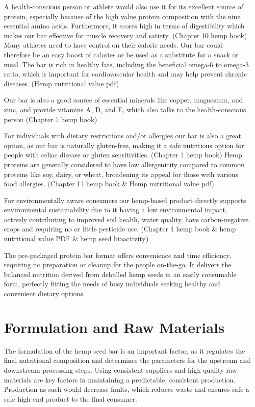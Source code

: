 \vspace{1em}
A health-conscious person or athlete would also use it for its excellent source of protein, especially because of the high value protein composition with the nine essential amino acids. Furthermore, it scores high in terms of digestibility which makes our bar effective for muscle recovery and satiety. (Chapter 10 hemp book) Many athletes need to have control on their calorie needs. Our bar could therefore be an easy boost of calories or be used as a substitute for a snack or meal.
\vspace{0.5em}
The bar is rich in healthy fats, including the beneficial omega-6 to omega-3 ratio, which is important for cardiovascular health and may help prevent chronic diseases. (Hemp nutritional value pdf)

\vspace{1em}
Our bar is also a good source of essential minerals like copper, magnesium, and zinc, and provide vitamins A, D, and E, which also talks to the health-conscious person (Chapter 1 hemp book)

\vspace{1em}
For individuals with dietary restrictions and/or allergies our bar is also a great option, as our bar is naturally gluten-free, making it a safe nutritious option for people with celiac disease or gluten sensitivities. (Chapter 1 hemp book) Hemp proteins are generally considered to have low allergenicity compared to common proteins like soy, dairy, or wheat, broadening its appeal for those with various food allergies. (Chapter 11 hemp book \& Hemp nutritional value pdf)

\vspace{1em}
For environmentally aware consumers our hemp-based product directly supports environmental sustainability due to it having a low environmental impact, actively contributing to improved soil health, water quality, have carbon-negative crops and requiring no or little pesticide use. (Chapter 1 hemp book \& hemp nutritional value PDF \& hemp seed bioactivity) 

\vspace{1em}
The pre-packaged protein bar format offers convenience and time efficiency, requiring no preparation or cleanup for the people on-the-go. It delivers the balanced nutrition derived from dehulled hemp seeds in an easily consumable form, perfectly fitting the needs of busy individuals seeking healthy and convenient dietary options.


\section{Formulation and Raw Materials}
The formulation of the hemp seed bar is an important factor, as it regulates the final nutritional composition and determines the parameters for the upstream and downstream processing steps. Using consistent suppliers and high-quality raw materials are key factors in maintaining a predictable, consistent production. Production as such would decrease faults, which reduces waste and ensures safe a safe high-end product to the final consumer. 

